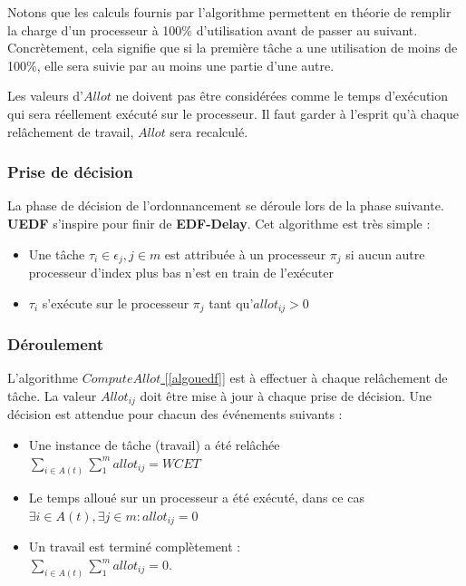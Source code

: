 	Notons que les calculs fournis par l'algorithme permettent en théorie de \og{}remplir\fg{} 
	la charge d'un processeur à 100\% d'utilisation avant de passer au suivant. Concrètement, 
	cela signifie que si la première tâche a une utilisation de moins de 100\%, elle sera suivie par 
	au moins une partie d'une autre.\newline
	
	Les valeurs d'$Allot$ ne doivent pas être considérées comme le temps d'exécution qui sera réellement 
	exécuté sur le processeur. Il faut garder à l'esprit qu'à chaque relâchement de travail, 
	$Allot$ sera recalculé. 

	\subsubsection{Prise de décision}
	La phase de décision de l'ordonnancement se déroule lors de la phase suivante.
	\textbf{UEDF} s'inspire pour finir de \textbf{EDF-Delay}. 
	Cet algorithme est très simple :
	\begin{itemize}
		\setlength\itemsep{0.1em}
		\item Une tâche $\tau_i \in \epsilon_j, j \in m$ est attribuée à un processeur $\pi_j$ si aucun autre processeur d'index plus bas n'est en train de l'exécuter
		\item $\tau_i$ s'exécute sur le processeur $\pi_j$ tant qu'$allot_{ij} > 0$
	\end{itemize}


	\subsubsection{Déroulement}	
	L'algorithme \hyperref[algouedf]{$Compute Allot$ [\ref*{algouedf}]} est à effectuer à chaque relâchement de tâche. La valeur $Allot_{ij}$ 
	doit être mise à jour à chaque prise de décision. Une décision est attendue pour chacun des événements suivants :
	\begin{itemize}
		\setlength\itemsep{0.1em}
		\item Une instance de tâche (travail) a été relâchée\\
		 $\sum_{i \in A(t)}\sum_{1}^{m}allot_{ij} = WCET$
		\item Le temps alloué sur un processeur a été exécuté, dans ce cas\\ $\exists i \in A(t), \exists j \in m : allot_{ij} = 0$
		\item Un travail est terminé complètement : \\
		$\sum_{i \in A(t)}\sum_{1}^{m}allot_{ij} = 0$.
	\end{itemize}
	
